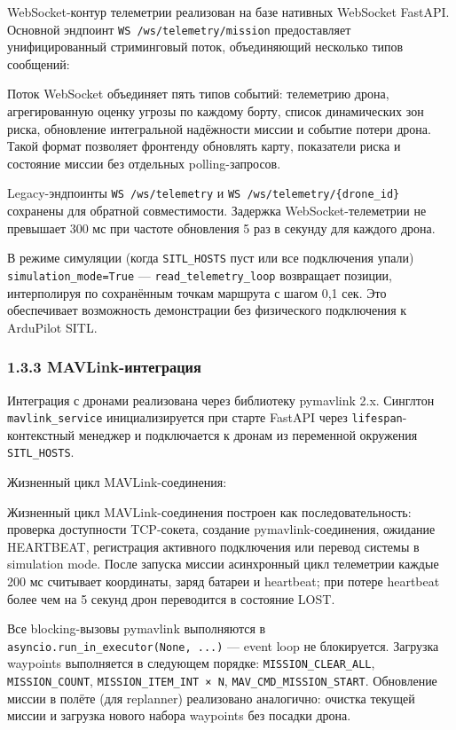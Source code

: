 \documentclass[14pt,a4paper]{extarticle}
\begin{document}
WebSocket-контур телеметрии реализован на базе нативных WebSocket FastAPI. Основной эндпоинт \texttt{WS\ /ws/telemetry/mission} предоставляет унифицированный стриминговый поток, объединяющий несколько типов сообщений:

Поток WebSocket объединяет пять типов событий: телеметрию дрона, агрегированную оценку угрозы по каждому борту, список динамических зон риска, обновление интегральной надёжности миссии и событие потери дрона. Такой формат позволяет фронтенду обновлять карту, показатели риска и состояние миссии без отдельных polling-запросов.


Legacy-эндпоинты \texttt{WS\ /ws/telemetry} и \texttt{WS\ /ws/telemetry/\{drone\_id\}} сохранены для обратной совместимости. Задержка WebSocket-телеметрии не превышает 300 мс при частоте обновления 5 раз в секунду для каждого дрона.

В режиме симуляции (когда \texttt{SITL\_HOSTS} пуст или все подключения упали) \texttt{simulation\_mode=True} --- \texttt{read\_telemetry\_loop} возвращает позиции, интерполируя по сохранённым точкам маршрута с шагом 0,1 сек. Это обеспечивает возможность демонстрации без физического подключения к ArduPilot SITL.

\hypertarget{mavlink-ux438ux43dux442ux435ux433ux440ux430ux446ux438ux44f}{%
\subsubsection{1.3.3 MAVLink-интеграция}\label{mavlink-ux438ux43dux442ux435ux433ux440ux430ux446ux438ux44f}}

Интеграция с дронами реализована через библиотеку pymavlink 2.x. Синглтон \texttt{mavlink\_service} инициализируется при старте FastAPI через \texttt{lifespan}-контекстный менеджер и подключается к дронам из переменной окружения \texttt{SITL\_HOSTS}.

Жизненный цикл MAVLink-соединения:

Жизненный цикл MAVLink-соединения построен как последовательность: проверка доступности TCP-сокета, создание pymavlink-соединения, ожидание HEARTBEAT, регистрация активного подключения или перевод системы в simulation mode. После запуска миссии асинхронный цикл телеметрии каждые 200 мс считывает координаты, заряд батареи и heartbeat; при потере heartbeat более чем на 5 секунд дрон переводится в состояние LOST.


Все blocking-вызовы pymavlink выполняются в \texttt{asyncio.run\_in\_executor(None,\ ...)} --- event loop не блокируется. Загрузка waypoints выполняется в следующем порядке: \texttt{MISSION\_CLEAR\_ALL}, \texttt{MISSION\_COUNT}, \texttt{MISSION\_ITEM\_INT\ ×\ N}, \texttt{MAV\_CMD\_MISSION\_START}. Обновление миссии в полёте (для replanner) реализовано аналогично: очистка текущей миссии и загрузка нового набора waypoints без посадки дрона.
\end{document}
